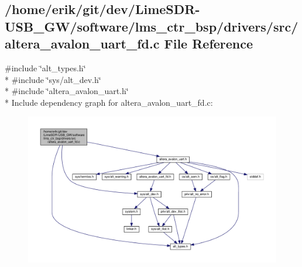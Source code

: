 \subsection{/home/erik/git/dev/\+Lime\+S\+D\+R-\/\+U\+S\+B\+\_\+\+G\+W/software/lms\+\_\+ctr\+\_\+bsp/drivers/src/altera\+\_\+avalon\+\_\+uart\+\_\+fd.c File Reference}
\label{altera__avalon__uart__fd_8c}
{\ttfamily \#include \char`\"{}alt\+\_\+types.\+h\char`\"{}}\\*
{\ttfamily \#include \char`\"{}sys/alt\+\_\+dev.\+h\char`\"{}}\\*
{\ttfamily \#include \char`\"{}altera\+\_\+avalon\+\_\+uart.\+h\char`\"{}}\\*
Include dependency graph for altera\+\_\+avalon\+\_\+uart\+\_\+fd.\+c\+:
\nopagebreak
\begin{figure}[H]
\begin{center}
\leavevmode
\includegraphics[width=350pt]{d4/d96/altera__avalon__uart__fd_8c__incl}
\end{center}
\end{figure}
